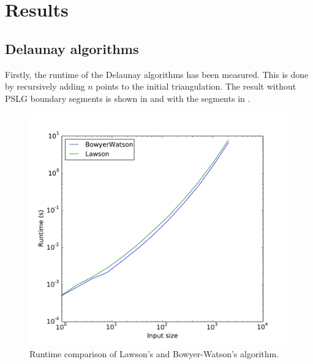 \section{Results}
\label{sec:results}

\subsection{Delaunay algorithms}
Firstly, the runtime of the Delaunay algorithms has been measured.
This is done by recursively adding $n$ points to the initial triangulation.
The result without PSLG boundary segments is shown in  and
with the segments in .



\begin{figure}
    \centering
    \includegraphics[width=\columnwidth]{../images/runtime.pdf}
    \caption{Runtime comparison of Lawson's and Bowyer-Watson's algorithm.}
    \label{fig:result_runtime}
\end{figure}

